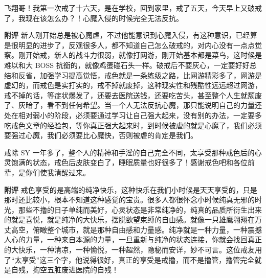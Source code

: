 \begin{case}
    飞翔哥！我第一次戒了十六天，是在学校，回到家里，戒了五天，今天早上又破戒了，我现在该怎么办？！心魔入侵的时候完全无法反抗。

    \textbf{附评} 新人刚开始总是被心魔虐，不过他能意识到心魔入侵，有这种意识，已经算是很明显的进步了，反观很多人，都不知道自己怎么破戒的，对内心没有一点点觉察。刚开始戒，新人的战斗力很弱，就像打网游，刚开始基本都是菜鸟，这时候是难以和大 BOSS 抗衡的，就像鸡蛋碰石头一样。破戒后不要灰心，一定要好好总结和反省，加强学习提高觉悟，戒色就是一条练级之路，比网游精彩多了，网游是虚幻的，而戒色是实打实的，戒不掉就废掉，这种现实性和残酷性远远超过网游，戒不掉的话，等症状爆发了，还要去医院送钱，还要吃苦头，甚至整个人生就颓废了、灰暗了，看不到任何希望。当一个人无法反抗心魔，那只能说明自己的力量还处在相对弱小的阶段，必须要通过学习让自己强大起来，没有别的办法，一定要多吃戒色文章的经验包，等你真正强大起来时，到时候被虐的就是心魔了，我们必须要强过心魔，我们必须要比心魔快，否则被虐的肯定是我们。
\end{case}

\begin{case}
    戒除 SY 一年多了，整个人的精神和手淫的自己完全不同，太享受那种戒色后的心灵饱满的状态，戒色后皮肤变白了，睡眠质量也好很多了！感谢戒色吧和各位前辈，是你们使我清醒过来。

    \textbf{附评} 戒色享受的是高端的纯净快乐，这种快乐在我们小时候是天天享受的，只是那时还比较小，根本不知道这种感觉的宝贵。很多人都很怀念小时候纯真无邪的时光，那些不撸的日子单纯而美好，心灵状态是非常纯净的，纯真的品质所衍生出来的就是喜悦，就是纯净的大快乐，摆脱欲望束缚的自由感。就像一只雄鹰翱翔在万丈高空，俯瞰整个城市，就是那种自由感和力量感。纯净就是一种力量，一种震撼人心的力量，一种来自本源的力量，一旦重新与纯净的状态连接，你就会找回真正的大快乐，一种清凉，一种愉悦，一种超然，隐秘而安详，妙不可言。这位戒友用了“太享受”这三个字，他说得很好，真正的享受是戒撸，而不是撸管，撸管完全就是自残，掏空五脏废进医院的自残！
\end{case}

